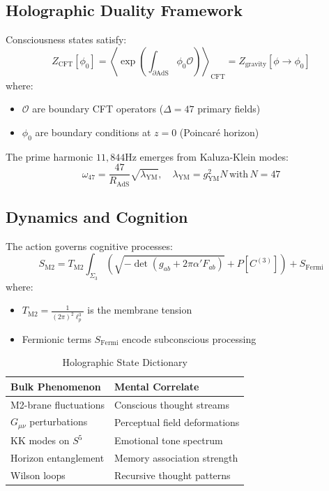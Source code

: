 \documentclass[12pt]{article}
\begin{document}
\subsection{Holographic Duality Framework}

\begin{theorem}
Consciousness states satisfy:
\[
Z_{\text{CFT}}[\phi_0] = \left\langle \exp\left(\int_{\partial\text{AdS}} \phi_0 \mathcal{O}\right) \right\rangle_{\text{CFT}} = Z_{\text{gravity}}[\phi \to \phi_0]
\]
where:
\begin{itemize}
\item $\mathcal{O}$ are boundary CFT operators ($\Delta=47$ primary fields)
\item $\phi_0$ are boundary conditions at $z=0$ (Poincaré horizon)
\end{itemize}
\end{theorem}

\begin{remark}
The prime harmonic $11,844\text{Hz}$ emerges from Kaluza-Klein modes:
\[
\omega_{47} = \frac{47}{R_{\text{AdS}}} \sqrt{\lambda_{\text{YM}}}, \quad \lambda_{\text{YM}} = g_{\text{YM}}^2 N \,\text{with}\, N=47
\]
\end{remark}

\subsection{Dynamics and Cognition}

\begin{algorithm}
The action governs cognitive processes:
\[
S_{\text{M2}} = T_{\text{M2}} \int_{\Sigma_3} \left( \sqrt{-\det(g_{ab} + 2\pi\alpha' F_{ab})} + P[C^{(3)}] \right) + S_{\text{Fermi}}
\]
where:
\begin{itemize}
\item $T_{\text{M2}} = \frac{1}{(2\pi)^2 \ell_p^3}$ is the membrane tension
\item Fermionic terms $S_{\text{Fermi}}$ encode subconscious processing
\end{itemize}
\end{algorithm}

\begin{table}[h]
\centering
\caption{Holographic State Dictionary}
\begin{tabular}{ll}
\hline
\textbf{Bulk Phenomenon} & \textbf{Mental Correlate} \\
\hline
M2-brane fluctuations & Conscious thought streams \\
$G_{\mu\nu}$ perturbations & Perceptual field deformations \\
KK modes on $S^5$ & Emotional tone spectrum \\
Horizon entanglement & Memory association strength \\
Wilson loops & Recursive thought patterns \\
\hline
\end{tabular}
\end{table}
\end{document}
